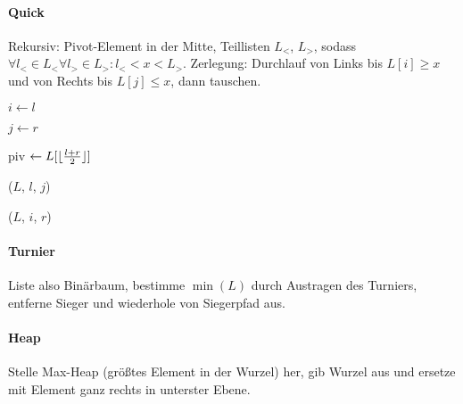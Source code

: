 \paragraph{Quick}
Rekursiv: Pivot-Element in der Mitte, Teillisten $L_<$, $L_>$, sodass $\forall l_< \in L_< \forall l_> \in L_>: l_< < x < L_>$. Zerlegung: Durchlauf von Links bis $L[i] \geq x$ und von Rechts bis $L[j] \leq x$, dann tauschen.


\begin{algorithm}[H]



  $i \leftarrow l$

  $j \leftarrow r$

  piv $\leftarrow L[\lfloor \frac{l + r}{2} \rfloor]$


  \Quicksort($L$, $l$, $j$)

  \Quicksort($L$, $i$, $r$)
\end{algorithm}

\paragraph{Turnier}
Liste also Binärbaum, bestimme $\min(L)$ durch Austragen des Turniers, entferne Sieger und wiederhole von Siegerpfad aus.

% 
% 

\paragraph{Heap}
Stelle Max-Heap (grö\ss tes Element in der Wurzel) her, gib Wurzel aus und ersetze mit Element ganz rechts in unterster Ebene.

